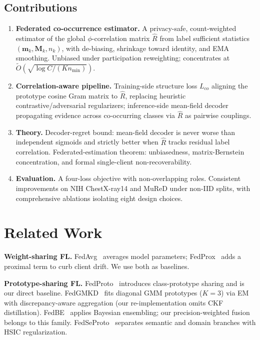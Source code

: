 \documentclass[conference]{IEEEtran}
\theoremstyle{definition}
\newcommand{\Rhat}{\widehat{R}}
\begin{document}
\subsection{Contributions}

\begin{enumerate}[leftmargin=*,itemsep=1pt]
  \item \textbf{Federated co-occurrence estimator.} A privacy-safe, count-weighted estimator of the global $\phi$-correlation matrix $\Rhat$ from label sufficient statistics $(\mathbf{m}_k,\mathbf{M}_k,n_k)$, with de-biasing, shrinkage toward identity, and EMA smoothing. Unbiased under participation reweighting; concentrates at $\tilde O(\sqrt{\log C/(K n_{\min})})$.
  \item \textbf{Correlation-aware pipeline.} Training-side structure loss $L_{co}$ aligning the prototype cosine Gram matrix to $\Rhat$, replacing heuristic contrastive/adversarial regularizers; inference-side mean-field decoder propagating evidence across co-occurring classes via $\Rhat$ as pairwise couplings.
  \item \textbf{Theory.} Decoder-regret bound: mean-field decoder is never worse than independent sigmoids and strictly better when $\Rhat$ tracks residual label correlation. Federated-estimation theorem: unbiasedness, matrix-Bernstein concentration, and formal single-client non-recoverability.
  \item \textbf{Evaluation.} A four-loss objective with non-overlapping roles. Consistent improvements on NIH ChestX-ray14 and MuReD under non-IID splits, with comprehensive ablations isolating eight design choices.
\end{enumerate}

\section{Related Work}

\noindent\textbf{Weight-sharing FL.} FedAvg~\cite{mcmahan2017fedavg} averages model parameters; FedProx~\cite{li2020fedprox} adds a proximal term to curb client drift. We use both as baselines.

\noindent\textbf{Prototype-sharing FL.} FedProto~\cite{tan2022fedproto} introduces class-prototype sharing and is our direct baseline. FedGMKD~\cite{zhang2024fedgmkd} fits diagonal GMM prototypes ($K{=}3$) via EM with discrepancy-aware aggregation (our re-implementation omits CKF distillation). FedBE~\cite{chen2021fedbe} applies Bayesian ensembling; our precision-weighted fusion belongs to this family. FedSeProto~\cite{fedseproto2024} separates semantic and domain branches with HSIC regularization.
\end{document}
